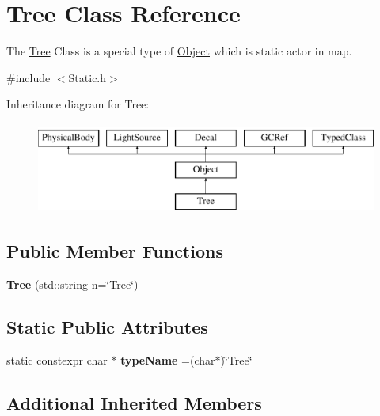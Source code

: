 \hypertarget{classTree}{}\section{Tree Class Reference}
\label{classTree}


The \hyperlink{classTree}{Tree} Class is a special type of \hyperlink{classObject}{Object} which is static actor in map.  




{\ttfamily \#include $<$Static.\+h$>$}

Inheritance diagram for Tree\+:\begin{figure}[H]
\begin{center}
\leavevmode
\includegraphics[height=3.000000cm]{classTree}
\end{center}
\end{figure}
\subsection*{Public Member Functions}
\begin{DoxyCompactItemize}
\item 
\hypertarget{classTree_ae87378915fea4c31cca95e768b62f2c1}{}{\bfseries Tree} (std\+::string n=\char`\"{}Tree\char`\"{})\label{classTree_ae87378915fea4c31cca95e768b62f2c1}

\end{DoxyCompactItemize}
\subsection*{Static Public Attributes}
\begin{DoxyCompactItemize}
\item 
\hypertarget{classTree_aaa9a72f41d4a4dbb7c86ddc8b1711473}{}static constexpr char $\ast$ {\bfseries type\+Name} =(char$\ast$)\char`\"{}Tree\char`\"{}\label{classTree_aaa9a72f41d4a4dbb7c86ddc8b1711473}

\end{DoxyCompactItemize}
\subsection*{Additional Inherited Members}


